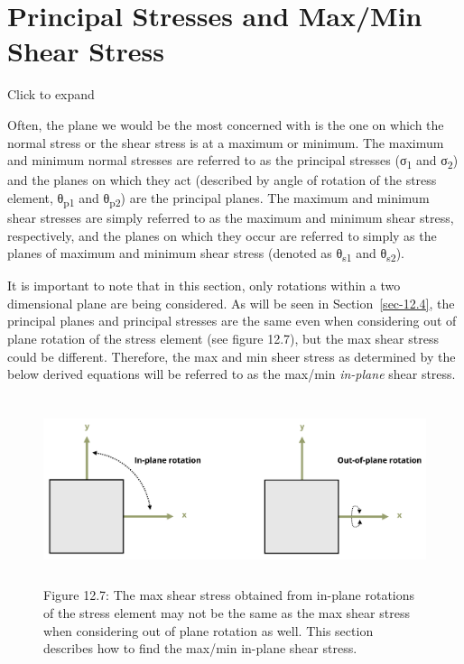 \documentclass[
  letterpaper,
  DIV=11,
  numbers=noendperiod]{scrreprt}
\theoremstyle{definition}
\theoremstyle{remark}
\begin{document}
\section{Principal Stresses and Max/Min Shear Stress}\label{sec-12.2}

Click to expand

Often, the plane we would be the most concerned with is the one on which
the normal stress or the shear stress is at a maximum or minimum. The
maximum and minimum normal stresses are referred to as the principal
stresses (σ\textsubscript{1} and σ\textsubscript{2}) and the planes on
which they act (described by angle of rotation of the stress element,
θ\textsubscript{p1} and θ\textsubscript{p2}) are the principal planes.
The maximum and minimum shear stresses are simply referred to as the
maximum and minimum shear stress, respectively, and the planes on which
they occur are referred to simply as the planes of maximum and minimum
shear stress (denoted as θ\textsubscript{s1} and θ\textsubscript{s2}).

It is important to note that in this section, only rotations within a
two dimensional plane are being considered. As will be seen in
Section~\ref{sec-12.4}, the principal planes and principal stresses are
the same even when considering out of plane rotation of the stress
element (see figure 12.7), but the max shear stress could be different.
Therefore, the max and min sheer stress as determined by the below
derived equations will be referred to as the max/min \emph{in-plane}
shear stress.

\begin{figure}[H]

{\centering \includegraphics[width=5.94792in,height=2.15625in]{images/CH12 figures/figure 12.7.png}

}

\caption{Figure 12.7: The max shear stress obtained from in-plane
rotations of the stress element may not be the same as the max shear
stress when considering out of plane rotation as well. This section
describes how to find the max/min in-plane shear stress.}

\end{figure}%
\end{document}
